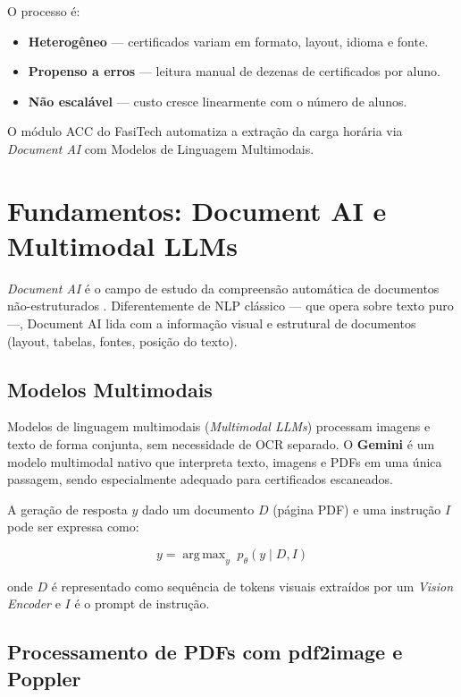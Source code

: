 \documentclass[12pt,a4paper]{report}
\DeclareMathOperator*{\argmax}{arg\,max}
\begin{document}
O processo é:
\begin{itemize}
  \item \textbf{Heterogêneo} — certificados variam em formato, layout, idioma e fonte.
  \item \textbf{Propenso a erros} — leitura manual de dezenas de certificados por aluno.
  \item \textbf{Não escalável} — custo cresce linearmente com o número de alunos.
\end{itemize}

O módulo ACC do FasiTech automatiza a extração da carga horária via
\textit{Document AI} com Modelos de Linguagem Multimodais.

\section{Fundamentos: Document AI e Multimodal LLMs}

\textit{Document AI} é o campo de estudo da compreensão automática de
documentos não-estruturados \autocite{cui2021documentai}.
Diferentemente de NLP clássico — que opera sobre texto puro —,
Document AI lida com a informação visual e estrutural de documentos
(layout, tabelas, fontes, posição do texto).

\subsection{Modelos Multimodais}

Modelos de linguagem multimodais (\textit{Multimodal LLMs}) processam
imagens e texto de forma conjunta, sem necessidade de OCR separado.
O \textbf{Gemini} \autocite{team2023gemini} é um modelo multimodal
nativo que interpreta texto, imagens e PDFs em uma única passagem,
sendo especialmente adequado para certificados escaneados.

A geração de resposta $y$ dado um documento $D$ (página PDF) e uma
instrução $I$ pode ser expressa como:

\begin{equation}
  y = \argmax_y\; p_\theta(y \mid D, I)
  \label{eq:multimodal}
\end{equation}

onde $D$ é representado como sequência de tokens visuais extraídos por
um \textit{Vision Encoder} e $I$ é o prompt de instrução.

\subsection{Processamento de PDFs com pdf2image e Poppler}
\end{document}
